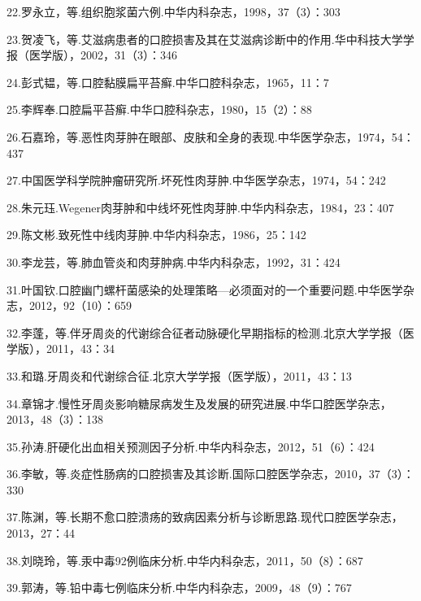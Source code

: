 22.罗永立，等.组织胞浆菌六例.中华内科杂志，1998，37（3）：303

23.贺凌飞，等.艾滋病患者的口腔损害及其在艾滋病诊断中的作用.华中科技大学学报（医学版），2002，31（3）：346

24.彭式韫，等.口腔黏膜扁平苔癣.中华口腔科杂志，1965，11：7

25.李辉奉.口腔扁平苔癣.中华口腔科杂志，1980，15（2）：88

26.石嘉玲，等.恶性肉芽肿在眼部、皮肤和全身的表现.中华医学杂志，1974，54：437

27.中国医学科学院肿瘤研究所.坏死性肉芽肿.中华医学杂志，1974，54：242

28.朱元珏.Wegener肉芽肿和中线坏死性肉芽肿.中华内科杂志，1984，23：407

29.陈文彬.致死性中线肉芽肿.中华内科杂志，1986，25：142

30.李龙芸，等.肺血管炎和肉芽肿病.中华内科杂志，1992，31：424

31.叶国钦.口腔幽门螺杆菌感染的处理策略---必须面对的一个重要问题.中华医学杂志，2012，92（10）：659

32.李蓬，等.伴牙周炎的代谢综合征者动脉硬化早期指标的检测.北京大学学报（医学版），2011，43：34

33.和璐.牙周炎和代谢综合征.北京大学学报（医学版），2011，43：13

34.章锦才.慢性牙周炎影响糖尿病发生及发展的研究进展.中华口腔医学杂志，2013，48（3）：138

35.孙涛.肝硬化出血相关预测因子分析.中华内科杂志，2012，51（6）：424

36.李敏，等.炎症性肠病的口腔损害及其诊断.国际口腔医学杂志，2010，37（3）：330

37.陈渊，等.长期不愈口腔溃疡的致病因素分析与诊断思路.现代口腔医学杂志，2013，27：44

38.刘晓玲，等.汞中毒92例临床分析.中华内科杂志，2011，50（8）：687

39.郭涛，等.铅中毒七例临床分析.中华内科杂志，2009，48（9）：767

\protect\hypertarget{text00154.html}{}{}

